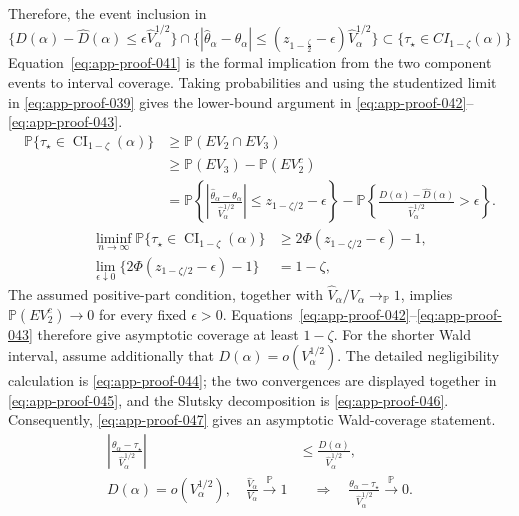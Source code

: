\documentclass[11pt]{article}
\numberwithin{equation}{section}
\newcommand{\Pbb}{\mathbb P}
\newcommand{\1}{\mathbf 1}
\newcommand{\abs}[1]{\left\lvert #1\right\rvert}
\begin{document}
Therefore, the event inclusion in
\begin{equation}
\label{eq:app-proof-041}
\{D(\alpha)-\widehat D(\alpha)\leq \epsilon \widehat V_{\alpha}^{1/2}\}
\cap \{\abs{\widehat\theta_{\alpha}-\theta_{\alpha}}\leq (z_{1-\frac{\zeta}2}-\epsilon)\widehat V_{\alpha}^{1/2}\}\subset \{\tau_\star \in CI_{1-\zeta}(\alpha)\}
\end{equation}
Equation~\eqref{eq:app-proof-041} is the formal implication from the two
component events to interval coverage.  Taking probabilities and using the
studentized limit in \eqref{eq:app-proof-039} gives the lower-bound argument
in \eqref{eq:app-proof-042}--\eqref{eq:app-proof-043}.
\begin{equation}
\label{eq:app-proof-042}
\begin{aligned}
\Pbb\{\tau_\star\in\operatorname{CI}_{1-\zeta}(\alpha)\}
&\ge\Pbb(EV_2\cap EV_3)\\
&\ge\Pbb(EV_3)-\Pbb(EV_2^c)\\
&=\Pbb\!\left\{
\abs{\frac{\widehat\theta_\alpha-\theta_\alpha}
{\widehat V_\alpha^{1/2}}}
\le z_{1-\zeta/2}-\epsilon
\right\}
-\Pbb\!\left\{
\frac{D(\alpha)-\widehat D(\alpha)}
{\widehat V_\alpha^{1/2}}>\epsilon
\right\}.
\end{aligned}
\end{equation}
\begin{equation}
\label{eq:app-proof-043}
\begin{aligned}
\liminf_{n\to\infty}
\Pbb\{\tau_\star\in\operatorname{CI}_{1-\zeta}(\alpha)\}
&\ge 2\Phi(z_{1-\zeta/2}-\epsilon)-1,\\
\lim_{\epsilon\downarrow0}
\{2\Phi(z_{1-\zeta/2}-\epsilon)-1\}
&=1-\zeta,
\end{aligned}
\end{equation}
The assumed positive-part condition, together with \(\widehat V_\alpha/V_\alpha\to_{\Pbb}1\), implies \(\Pbb(EV_2^c)\to0\) for every fixed \(\epsilon>0\).  Equations~\eqref{eq:app-proof-042}--\eqref{eq:app-proof-043} therefore give asymptotic coverage at least \(1-\zeta\).  For the shorter Wald interval, assume additionally that \(D(\alpha)=o(V_\alpha^{1/2})\).  The detailed negligibility calculation is \eqref{eq:app-proof-044}; the two convergences are displayed together in \eqref{eq:app-proof-045}, and the Slutsky decomposition is \eqref{eq:app-proof-046}.  Consequently, \eqref{eq:app-proof-047} gives an asymptotic Wald-coverage statement.
\begin{equation}
\label{eq:app-proof-044}
\begin{aligned}
\abs{\frac{\theta_\alpha-\tau_\star}
{\widehat V_\alpha^{1/2}}}
&\le\frac{D(\alpha)}{\widehat V_\alpha^{1/2}},\\
D(\alpha)=o(V_\alpha^{1/2}),\quad
\frac{\widehat V_\alpha}{V_\alpha}\xrightarrow{\Pbb}1
&\quad\Longrightarrow\quad
\frac{\theta_\alpha-\tau_\star}
{\widehat V_\alpha^{1/2}}\xrightarrow{\Pbb}0.
\end{aligned}
\end{equation}
\end{document}
